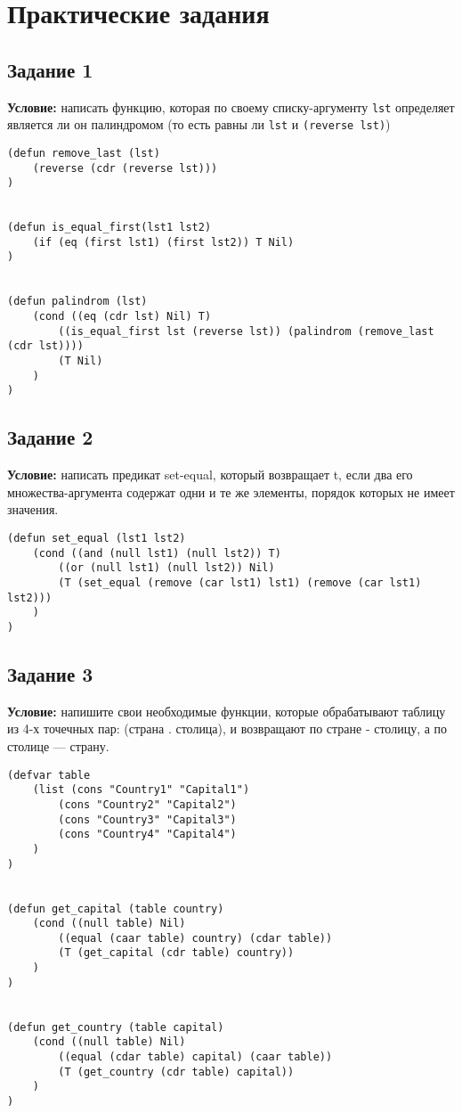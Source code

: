 \chapter{Практические задания}

\section{Задание 1}

\textbf{Условие:} написать функцию, которая по своему списку-аргументу \texttt{lst} определяет является ли он палиндромом (то есть равны ли \texttt{lst} и \texttt{(reverse lst)})

\begin{lstlisting}
(defun remove_last (lst)
    (reverse (cdr (reverse lst)))
)


(defun is_equal_first(lst1 lst2)
    (if (eq (first lst1) (first lst2)) T Nil)
)


(defun palindrom (lst) 
    (cond ((eq (cdr lst) Nil) T)
        ((is_equal_first lst (reverse lst)) (palindrom (remove_last (cdr lst))))
        (T Nil)
    )
)    
\end{lstlisting}


\section{Задание 2}

\textbf{Условие:} написать предикат set-equal, который возвращает t, если два его множества-аргумента содержат одни и те же элементы, порядок которых не имеет значения.

\begin{lstlisting}
(defun set_equal (lst1 lst2)
    (cond ((and (null lst1) (null lst2)) T)
        ((or (null lst1) (null lst2)) Nil)
        (T (set_equal (remove (car lst1) lst1) (remove (car lst1) lst2)))
    )
)
\end{lstlisting}


\section{Задание 3}

\textbf{Условие:} напишите свои необходимые функции, которые обрабатывают таблицу из 4-х точечных пар: (страна . столица), и возвращают по стране - столицу, а по столице — страну.


\begin{lstlisting}
(defvar table 
    (list (cons "Country1" "Capital1")
        (cons "Country2" "Capital2")
        (cons "Country3" "Capital3")
        (cons "Country4" "Capital4")
    )
)


(defun get_capital (table country)
    (cond ((null table) Nil)
        ((equal (caar table) country) (cdar table))
        (T (get_capital (cdr table) country))
    )
)


(defun get_country (table capital)
    (cond ((null table) Nil)
        ((equal (cdar table) capital) (caar table))
        (T (get_country (cdr table) capital))
    )
)
\end{lstlisting}




